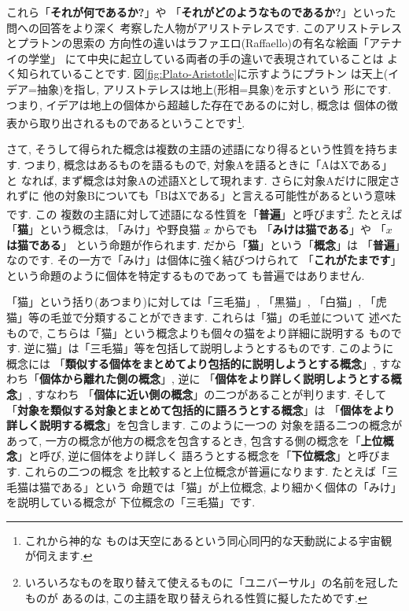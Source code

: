 これら「\textbf{それが何であるか?}」や
「\textbf{それがどのようなものであるか?}」といった問への回答をより深く
考察した人物がアリストテレスです. このアリストテレスとプラトンの思索の
方向性の違いはラファエロ(Raffaello)の有名な絵画「アテナイの学堂」
\cite{アテナイ}にて中央に起立している両者の手の違いで表現されていることは
よく知られていることです. 図\ref{fig:Plato-Aristotle}に示すようにプラトン
は天上(イデア=抽象)を指し, アリストテレスは地上(形相=具象)を示すという
形にです. つまり, イデアは地上の個体から超越した存在であるのに対し, 概念は
個体の徴表から取り出されるものであるということです\footnote{これから神的な
ものは天空にあるという同心同円的な天動説による宇宙観が伺えます.}.
\newline

さて, そうして得られた概念は複数の主語の述語になり得るという性質を持ちます.
 つまり, 概念はあるものを語るもので, 対象Aを語るときに「AはXである」と
なれば, まず概念は対象Aの述語Xとして現れます. さらに対象Aだけに限定されずに
他の対象Bについても「BはXである」と言える可能性があるという意味です. この
複数の主語に対して述語になる性質を「\textbf{普遍}」と呼びます\footnote{
いろいろなものを取り替えて使えるものに「ユニバーサル」の名前を冠したものが
あるのは, この主語を取り替えられる性質に擬したためです.}. たとえば
「\textbf{猫}」という概念は, 「みけ」や野良猫 $x$ からでも
「\textbf{みけは猫である}」や 「\textbf{$x$ は猫である}」
という命題が作られます. だから「\textbf{猫}」という「\textbf{概念}」は
「\textbf{普遍}」なのです. その一方で「みけ」は個体に強く結びつけられて
「\textbf{これがたまです}」という命題のように個体を特定するものであって
も普遍ではありません.
\newline

「猫」という括り(あつまり)に対しては「三毛猫」, 「黒猫」, 「白猫」,
 「虎猫」等の毛並で分類することができます. これらは「猫」の毛並について
述べたもので, こちらは「猫」という概念よりも個々の猫をより詳細に説明する
ものです. 逆に猫」は「三毛猫」等を包括して説明しようとするものです.
 このように概念には
「\textbf{類似する個体をまとめてより包括的に説明しようとする概念}」,
 すなわち「\textbf{個体から離れた側の概念}」, 逆に
「\textbf{個体をより詳しく説明しようとする概念}」, すなわち
「\textbf{個体に近い側の概念}」の二つがあることが判ります. そして
「\textbf{対象を類似する対象とまとめて包括的に語ろうとする概念}」は
「\textbf{個体をより詳しく説明する概念}」を包含します. このように一つの
対象を語る二つの概念があって, 一方の概念が他方の概念を包含するとき,
 包含する側の概念を「\textbf{上位概念}」と呼び, 逆に個体をより詳しく
語ろうとする概念を「\textbf{下位概念}」と呼びます. これらの二つの概念
を比較すると上位概念が普遍になります. たとえば「三毛猫は猫である」という
命題では「猫」が上位概念, より細かく個体の「みけ」を説明している概念が
下位概念の「三毛猫」です.
\newline

